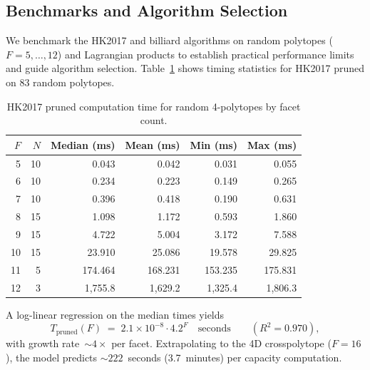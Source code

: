 %
%

\subsection{Benchmarks and Algorithm Selection}
\label{sec:benchmark}

We benchmark the HK2017 and billiard algorithms on random polytopes
($F = 5, \ldots, 12$) and Lagrangian products to establish practical
performance limits and guide algorithm selection. Table~\ref{tab:benchmark-stats}
shows timing statistics for HK2017 pruned on 83 random polytopes.

\begin{table}[h]
\centering
\begin{tabular}{rrrrrr}
\toprule
$F$ & $N$ & Median (ms) & Mean (ms) & Min (ms) & Max (ms) \\
\midrule
 5 & 10 &    0.043 &    0.042 &    0.031 &    0.055 \\
 6 & 10 &    0.234 &    0.223 &    0.149 &    0.265 \\
 7 & 10 &    0.396 &    0.418 &    0.190 &    0.631 \\
 8 & 15 &    1.098 &    1.172 &    0.593 &    1.860 \\
 9 & 15 &    4.722 &    5.004 &    3.172 &    7.588 \\
10 & 15 &   23.910 &   25.086 &   19.578 &   29.825 \\
11 &  5 &  174.464 &  168.231 &  153.235 &  175.831 \\
12 &  3 & 1{,}755.8 & 1{,}629.2 & 1{,}325.4 & 1{,}806.3 \\
\bottomrule
\end{tabular}
\caption{HK2017 pruned computation time for random 4-polytopes by facet count.}
\label{tab:benchmark-stats}
\end{table}

A log-linear regression on the median times yields
\[
  T_{\mathrm{pruned}}(F) \;=\; 2.1 \times 10^{-8} \cdot 4.2^F \quad\text{seconds}
  \qquad (R^2 = 0.970),
\]
with growth rate~${\sim}4\times$ per facet. Extrapolating to the
4D crosspolytope ($F = 16$), the model predicts ${\sim}222$~seconds
(3.7~minutes) per capacity computation.

